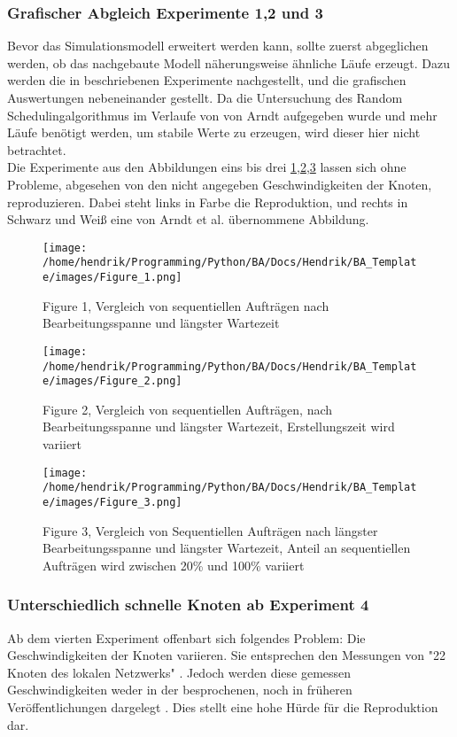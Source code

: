 \subsubsection{Grafischer Abgleich Experimente 1,2 und 3}
Bevor das Simulationsmodell erweitert werden kann, sollte zuerst abgeglichen werden, ob das nachgebaute Modell näherungsweise ähnliche Läufe erzeugt. Dazu werden die in \cite[p.~100-104]{Arn99} beschriebenen Experimente nachgestellt, und die grafischen Auswertungen nebeneinander gestellt.
Da die Untersuchung des Random Schedulingalgorithmus im Verlaufe von \cite[p. ~100]{Arn99} von Arndt aufgegeben wurde und mehr Läufe benötigt werden, um stabile Werte zu erzeugen, wird dieser hier nicht betrachtet.\\
Die Experimente aus den Abbildungen eins bis drei \ref{figure1},\ref{figure2},\ref{figure3} lassen sich ohne Probleme, abgesehen von den nicht angegeben Geschwindigkeiten der Knoten, reproduzieren. Dabei steht links in Farbe die Reproduktion, und rechts in Schwarz und Weiß eine von Arndt et al. \cite{Arn99} übernommene Abbildung.
\begin{figure}
\centering
\texttt{[image: /home/hendrik/Programming/Python/BA/Docs/Hendrik/BA\_Template/images/Figure\_1.png]}
\caption{Figure 1, Vergleich von sequentiellen Aufträgen nach Bearbeitungsspanne und längster Wartezeit}
\label{figure1}
\end{figure}
\begin{figure}
	\centering
	\texttt{[image: /home/hendrik/Programming/Python/BA/Docs/Hendrik/BA\_Template/images/Figure\_2.png]}
	\caption{Figure 2, Vergleich von sequentiellen Aufträgen, nach Bearbeitungsspanne und längster Wartezeit, Erstellungszeit wird variiert}
	\label{figure2}
\end{figure}
\begin{figure}
	\centering
	\texttt{[image: /home/hendrik/Programming/Python/BA/Docs/Hendrik/BA\_Template/images/Figure\_3.png]}
	\caption{Figure 3, Vergleich von Sequentiellen Aufträgen nach längster Bearbeitungsspanne und längster Wartezeit, Anteil an sequentiellen Aufträgen wird zwischen 20\% und 100\% variiert}
	\label{figure3}
\end{figure}

\FloatBarrier

\subsubsection{Unterschiedlich schnelle Knoten ab Experiment 4}
\label{repr}
Ab dem vierten Experiment offenbart sich folgendes Problem: Die Geschwindigkeiten der Knoten variieren. Sie entsprechen den Messungen von "22 Knoten des lokalen Netzwerks" \cite[p.~102]{Arn99}. Jedoch werden diese gemessen Geschwindigkeiten weder in der besprochenen, noch in früheren Veröffentlichungen dargelegt \cite{norepr1,norepr2}. Dies stellt eine hohe Hürde für die Reproduktion dar.\\

